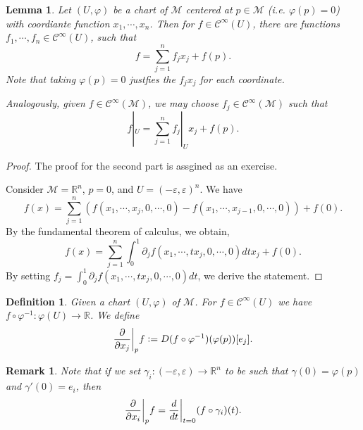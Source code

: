 \documentclass[8pt]{article}
\newtheorem{definition}{Definition}[section]
\newtheorem{lemma}{Lemma}[section]
\newtheorem{remark}{Remark}[section]
\newcommand{\defeq}{\vcentcolon=}
\newcommand{\R}[0]{\mathbb{R}}
\newcommand{\M}[0]{\mathcal{M}}
\newcommand{\cinf}[0]{\mathcal{C}^\infty}
\begin{document}
\begin{lemma}
Let $(U,\varphi)$ be a chart of $\M$ centered at $p\in\M$ (i.e. $\varphi(p) = 0$) with coordiante function $x_1,\cdots,x_n$. 
Then for $f\in\cinf(U)$, there are functions $f_1,\cdots, f_n\in\cinf(U)$, such that 
\begin{equation*}
f = \sum_{j=1}^n f_jx_j+f(p).
\end{equation*} 
Note that taking $\varphi(p)=0$ justfies the $f_jx_j$ for each coordinate.
\par Analogously, given $f\in\cinf(\M)$, we may choose $f_j\in\cinf(\M)$ such that 
\begin{equation*}
  f|_U = \sum_{j=1}^n f_j|_Ux_j +f(p).
\end{equation*}
\end{lemma}

\begin{proof}
  The proof for the second part is assgined as an exercise. 
  \par Consider $\M=\R^n$, $p=0$, and $U = (-\varepsilon,\varepsilon)^n$. We have 
  \begin{equation*}
    f(x) = \sum_{j=1}^n (f(x_1,\cdots,x_j,0,\cdots,0)-f(x_1,\cdots,x_{j-1},0,\cdots,0))+f(0).
  \end{equation*}
  By the fundamental theorem of calculus, we obtain, 
  \begin{equation*}
    f(x) = \sum_{j=1}^n \int_0^1 \partial_jf(x_1,\cdots,tx_j,0,\cdots,0)dtx_j+f(0).
  \end{equation*}
  By setting $f_j = \int_0^1 \partial_jf(x_1,\cdots,tx_j,0,\cdots,0)dt$, we derive the statement.
\end{proof}

\begin{definition}
  Given a chart $(U,\varphi)$ of $\M$. For $f\in\cinf(U)$ we have $f\circ\varphi^{-1}:\varphi(U)\to \R$. We define 
  \begin{equation*}
    {\frac \partial {\partial x_j}}\bigg{|}_pf \defeq  D(f\circ\varphi^{-1})(\varphi(p))[e_j].
  \end{equation*}
\end{definition}

\begin{remark}
  Note that if we set $\gamma_i:(-\varepsilon,\varepsilon)\to\R^n$ to be such that $\gamma(0) = \varphi(p)$ and $\gamma'(0) = e_i$, then 
  \begin{equation*}
    {\frac \partial {\partial x_i}}\bigg{|}_pf = {\frac {d} {dt}}\bigg{|}_{t=0}(f\circ\gamma_i)(t).
  \end{equation*}
\end{remark}
\end{document}
